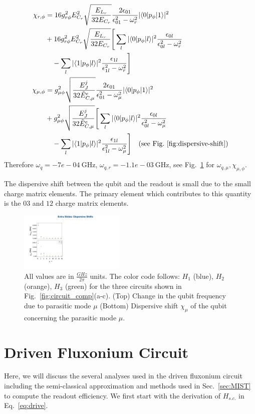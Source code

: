 \documentclass[%
reprint,
superscriptaddress,
 amsmath,amssymb,
 aps,
 prx,
longbibliography,
floatfix,
]{revtex4-2}
\newcommand{\singh}[1]{{\color{orange}{{}#1}}}%
\begin{document}
{\begin{align}
\chi_{r,\phi}&=16g_{r\phi}^2E_{C_r}^2\sqrt{\frac{E_{L_r}}{32E_{C_r}}}\frac{2\epsilon_{01}}{\epsilon_{01}^2-\omega_r^2}|\langle 0|p_\phi|1 \rangle|^2\nonumber\\
   &+16g_{r\phi}^2E_{C_r}^2\sqrt{\frac{E_{L_r}}{32E_{C_r}}}\Bigg[\sum_l|\langle 0|p_\phi|l \rangle|^2\frac{\epsilon_{0l}}{\epsilon_{0l}^2-\omega_r^2}\nonumber\\&\quad-\sum_l|\langle 1|p_\phi|l \rangle|^2\frac{\epsilon_{1l}}{\epsilon_{1l}^2-\omega_r^2}\Bigg] \\
   \chi_{\mu,\phi}&=g_{\mu\phi}^2\sqrt{\frac{E_J^j}{32\tilde{E}_{C,\mu}^e}}\frac{2\epsilon_{01}}{\epsilon_{01}^2-\omega_\mu^2}|\langle 0|p_\phi|1 \rangle|^2\nonumber\\
   &+g_{\mu\phi}^2\sqrt{\frac{E_J^j}{32\tilde{E}_{C,\mu}^e}}\Bigg[\sum_l|\langle 0|p_\phi|l \rangle|^2\frac{\epsilon_{0l}}{\epsilon_{0l}^2-\omega_\mu^2}\nonumber\\&\quad-\sum_l|\langle 1|p_\phi|l \rangle|^2\frac{\epsilon_{1l}}{\epsilon_{1l}^2-\omega_\mu^2}\Bigg]
   \quad\text{(see Fig.~\ref{fig:dispersive-shift})}
\end{align}
}
Therefore $\omega_q=-7e-04 \ \mathrm{GHz}$, $\omega_{q,r}=-1.1e-03 \ \mathrm{GHz}$, see Fig.~\ref{fig:dispersive-shift} for $\omega_{q,\mu},\chi_{\mu,\phi}$.
   
The dispersive shift between the qubit and the readout is small due to the small charge matrix elements. The primary element which contributes to this quantity is the $03$ and $12$ charge matrix elements. 
\begin{figure}[htb]
    \centering
    \includegraphics[width=0.45\textwidth]{Figures/dispersive-shift.pdf}
    \caption{All values are in $\frac{GHz}{2\pi}$ units. The color code follows: $H_1$ (blue), $H_2$ (orange), $H_3$ (green) for the three circuits shown in Fig.~\ref{fig:circuit_comp}(a-c). (Top) Change in the qubit frequency due to parasitic mode $\mu$ (Bottom) Dispersive shift $\chi_\mu$ of the qubit concerning the parasitic mode $\mu$.}
    \label{fig:dispersive-shift}
\end{figure}
\section{Driven Fluxonium Circuit}\label{app:MIST}
Here, we will discuss the several analyses used in the driven fluxonium circuit including the semi-classical approximation and methods used in Sec.~\ref{sec:MIST} to compute the readout efficiency. We first start with the derivation of $H_{s.c.}$ in Eq.~\ref{eq:drive}. \singh{Derivation goes here}
\end{document}
